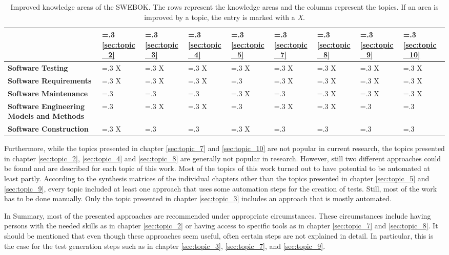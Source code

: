 \begin{table} [H] 
	\begin{small}
	\caption{Improved knowledge areas of the SWEBOK. The rows represent the knowledge areas and the columns represent the topics. If an area is improved by a topic, the entry is marked with a \textit{X}.}
	\renewcommand{\arraystretch}{1.5}
	\begin{tabularx}{\textwidth}{X|>{\hsize=.3\hsize}X|>{\hsize=.3\hsize}X|>{\hsize=.3\hsize}X|>{\hsize=.3\hsize}X|>{\hsize=.3\hsize}X|>{\hsize=.3\hsize}X|>{\hsize=.3\hsize}X|>{\hsize=.3\hsize}X}
		\hline
  		& \ref{sec:topic_2} & \ref{sec:topic_3} & \ref{sec:topic_4} & \ref{sec:topic_5} & \ref{sec:topic_7} & \ref{sec:topic_8} & \ref{sec:topic_9} & \ref{sec:topic_10} \\
  		\hline
  		\textbf{Software Testing} & X & X & X & X & X & X & X & X \\
  		\hline
      \textbf{Software \newline Requirements} & X & X & X &  & X & X & X & X \\
  		\hline
      \textbf{Software \newline Maintenance} &  &  &  & X &  & X & X & X \\
  		\hline
      \textbf{Software \newline Engineering Models and Methods} &  & X & X &  & X & X &  &  \\
  		\hline
      \textbf{Software \newline Construction} & X &  &  & X &  &  &  &  \\
  		\hline
 	\end{tabularx}
 	\renewcommand{\arraystretch}{1}
 	\label{table:swebok-overview}
 	\end{small}	
\end{table}

Furthermore, while the topics presented in chapter \ref{sec:topic_7} and \ref{sec:topic_10} are not popular in current research, the topics presented in chapter \ref{sec:topic_2}, \ref{sec:topic_4} and \ref{sec:topic_8} are generally not popular in research. However, still two different approaches could be found and are described for each topic of this work. Most of the topics of this work turned out to have potential to be automated at least partly. According to the synthesis matrices of the individual chapters other than the topics presented in chapter \ref{sec:topic_5} and \ref{sec:topic_9}, every topic included at least one approach that uses some automation steps for the creation of tests. Still, most of the work has to be done manually. Only the topic presented in chapter \ref{sec:topic_3} includes an approach that is mostly automated.

In Summary, most of the presented approaches are recommended under appropriate circumstances. These circumstances include having persons with the needed skills as in chapter \ref{sec:topic_2} or having access to specific tools as in chapter \ref{sec:topic_7} and \ref{sec:topic_8}. It should be mentioned that even though these approaches seem useful, often certain steps are not explained in detail. In particular, this is the case for the test generation steps such as in chapter \ref{sec:topic_3}, \ref{sec:topic_7}, and \ref{sec:topic_9}. 
